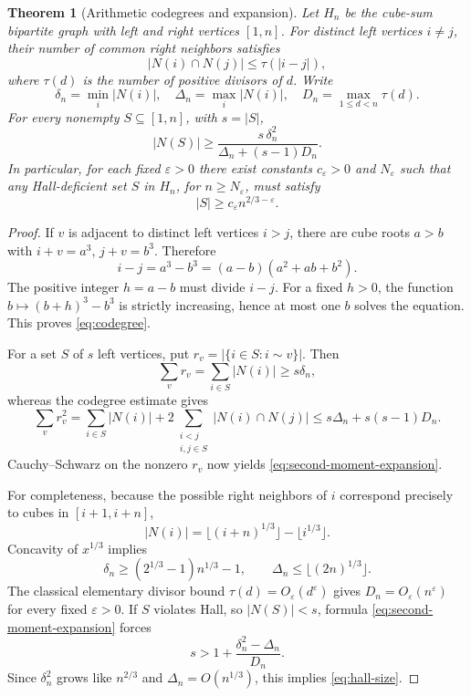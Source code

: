 \documentclass[10pt]{article}
\newtheorem{theorem}{Theorem}
\begin{document}
\begin{theorem}[Arithmetic codegrees and expansion]
\label{thm:arith-expansion}
Let $H_n$ be the cube-sum bipartite graph
with left and right vertices $[1,n]$.
For distinct left vertices $i\ne j$,
their number of common right neighbors
satisfies
\begin{equation}\label{eq:codegree}
\boxed{\displaystyle
|N(i)\cap N(j)|\le\tau(|i-j|),}
\end{equation}
where $\tau(d)$ is the number of
positive divisors of $d$.
Write
\[
\delta_n=\min_i|N(i)|,\quad
\Delta_n=\max_i|N(i)|,\quad
D_n=\max_{1\le d<n}\tau(d).
\]
For every nonempty $S\subseteq[1,n]$,
with $s=|S|$,
\begin{equation}\label{eq:second-moment-expansion}
\boxed{\displaystyle
|N(S)|\ge
\frac{s\,\delta_n^2}
{\Delta_n+(s-1)D_n}.}
\end{equation}
In particular, for each fixed
$\varepsilon>0$ there exist constants
$c_\varepsilon>0$ and $N_\varepsilon$
such that any Hall-deficient set
$S$ in $H_n$, for $n\ge N_\varepsilon$,
must satisfy
\begin{equation}\label{eq:hall-size}
\boxed{\displaystyle
|S|\ge c_\varepsilon
n^{2/3-\varepsilon}.}
\end{equation}
\end{theorem}
\begin{proof}
If $v$ is adjacent to distinct left
vertices $i>j$, there are cube roots
$a>b$ with
$i+v=a^3$, $j+v=b^3$.
Therefore
\[
i-j=a^3-b^3
=(a-b)(a^2+ab+b^2).
\]
The positive integer $h=a-b$
must divide $i-j$.
For a fixed $h>0$, the function
$b\mapsto(b+h)^3-b^3$ is strictly
increasing, hence at most one
$b$ solves the equation.
This proves \eqref{eq:codegree}.

For a set $S$ of $s$ left vertices,
put $r_v=|\{i\in S:i\sim v\}|$.
Then
\[
\sum_v r_v
=\sum_{i\in S}|N(i)|\ge s\delta_n,
\]
whereas the codegree estimate gives
\[
\sum_v r_v^2
=\sum_{i\in S}|N(i)|
+2\!\!\sum_{\substack{i<j\\i,j\in S}}
|N(i)\cap N(j)|
\le s\Delta_n+s(s-1)D_n.
\]
Cauchy--Schwarz on the nonzero $r_v$
now yields \eqref{eq:second-moment-expansion}.

For completeness, because the possible
right neighbors of $i$ correspond
precisely to cubes in $[i+1,i+n]$,
\[
|N(i)|
=\lfloor(i+n)^{1/3}\rfloor
 -\lfloor i^{1/3}\rfloor.
\]
Concavity of $x^{1/3}$ implies
\[
\delta_n\ge
(2^{1/3}-1)n^{1/3}-1,
\qquad
\Delta_n\le\lfloor(2n)^{1/3}\rfloor.
\]
The classical elementary divisor bound
$\tau(d)=O_\varepsilon(d^\varepsilon)$
gives $D_n=O_\varepsilon(n^\varepsilon)$
for every fixed $\varepsilon>0$.
If $S$ violates Hall, so
$|N(S)|<s$, formula
\eqref{eq:second-moment-expansion}
forces
\[
s>1+\frac{\delta_n^2-\Delta_n}{D_n}.
\]
Since $\delta_n^2$ grows like
$n^{2/3}$ and $\Delta_n=O(n^{1/3})$,
this implies \eqref{eq:hall-size}.
\end{proof}
\end{document}
